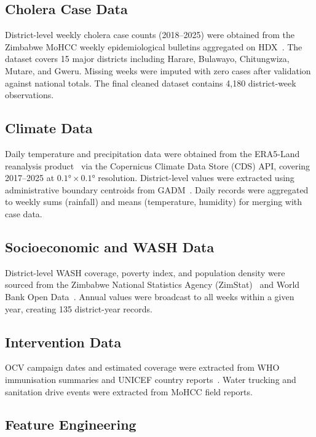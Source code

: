 \documentclass[conference]{IEEEtran}
\begin{document}
\subsection{Cholera Case Data}

District-level weekly cholera case counts (2018--2025) were obtained from the
Zimbabwe MoHCC weekly epidemiological bulletins aggregated on HDX~\cite{hdx}.
The dataset covers 15 major districts including Harare, Bulawayo, Chitungwiza,
Mutare, and Gweru. Missing weeks were imputed with zero cases after validation
against national totals. The final cleaned dataset contains 4,180 district-week
observations.

\subsection{Climate Data}

Daily temperature and precipitation data were obtained from the ERA5-Land
reanalysis product~\cite{era5} via the Copernicus Climate Data Store (CDS) API,
covering 2017--2025 at $0.1°\times0.1°$ resolution. District-level values were
extracted using administrative boundary centroids from GADM~\cite{gadm}. Daily
records were aggregated to weekly sums (rainfall) and means (temperature,
humidity) for merging with case data.

\subsection{Socioeconomic and WASH Data}

District-level WASH coverage, poverty index, and population density were sourced
from the Zimbabwe National Statistics Agency (ZimStat)~\cite{zimstat2022} and
World Bank Open Data~\cite{world_bank_wash_2022}. Annual values were broadcast
to all weeks within a given year, creating 135 district-year records.

\subsection{Intervention Data}

OCV campaign dates and estimated coverage were extracted from WHO immunisation
summaries and UNICEF country reports~\cite{who_ocv_2023}. Water trucking and
sanitation drive events were extracted from MoHCC field reports.

\subsection{Feature Engineering}
\end{document}
